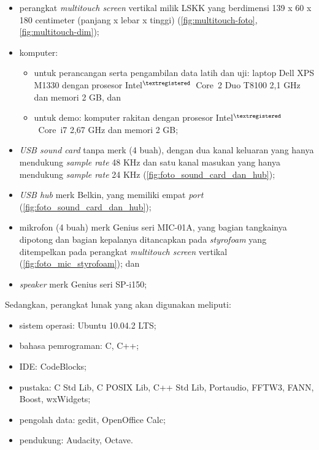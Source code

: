 \begin{itemize}
\item perangkat \textit{multitouch screen} vertikal milik LSKK yang berdimensi 139 x 60 x 180 centimeter (panjang x lebar x tinggi) (\autoref{fig:multitouch-foto}, \autoref{fig:multitouch-dim});

\item komputer:
\begin{itemize}
\item untuk perancangan serta pengambilan data latih dan uji: laptop Dell XPS M1330 dengan prosesor Intel$^{\small{\textregistered}}$~Core\texttrademark~2 Duo T8100 2,1 GHz dan memori 2 GB, dan
\item untuk demo: komputer rakitan dengan prosesor Intel$^{\small{\textregistered}}$~Core\texttrademark~i7 2,67 GHz dan memori 2 GB;
\end{itemize}

\item \textit{USB sound card} tanpa merk (4 buah), dengan dua kanal keluaran yang hanya mendukung \textit{sample rate} 48 KHz dan satu kanal masukan yang hanya mendukung \textit{sample rate} 24 KHz (\autoref{fig:foto_sound_card_dan_hub});

\item \textit{USB hub} merk Belkin, yang memiliki empat \textit{port} (\autoref{fig:foto_sound_card_dan_hub}); 

\item mikrofon (4 buah) merk Genius seri MIC-01A, yang bagian tangkainya dipotong dan bagian kepalanya ditancapkan pada \textit{styrofoam} yang ditempelkan pada perangkat \textit{multitouch screen} vertikal (\autoref{fig:foto_mic_styrofoam}); dan

\item \textit{speaker} merk Genius seri SP-i150;
\end{itemize}

Sedangkan, perangkat lunak yang akan digunakan meliputi:

\begin{itemize}
\item sistem operasi: Ubuntu 10.04.2 LTS;
\item bahasa pemrograman: C, C++;
\item IDE: CodeBlocks;
\item pustaka: C Std Lib, C POSIX Lib, C++ Std Lib, Portaudio, FFTW3, FANN, Boost, wxWidgets;
\item pengolah data: gedit, OpenOffice Calc;
\item pendukung: Audacity, Octave.
\end{itemize}


